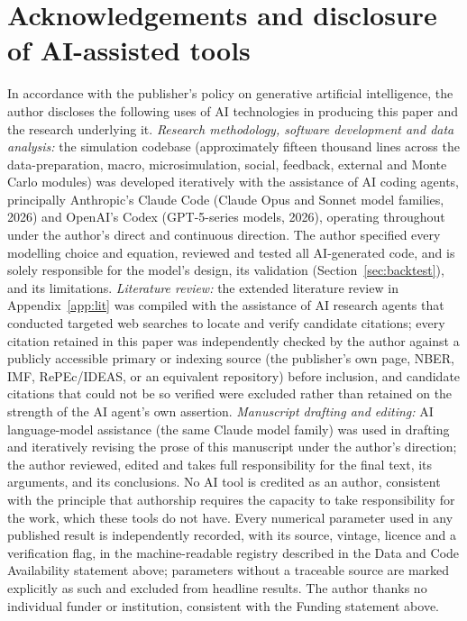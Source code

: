 \documentclass[11pt,a4paper]{article}
\begin{document}
\section*{Acknowledgements and disclosure of AI-assisted tools}
In accordance with the publisher's policy on generative artificial intelligence, the author discloses the following uses of AI technologies in producing this paper and the research underlying it. \emph{Research methodology, software development and data analysis:} the simulation codebase (approximately fifteen thousand lines across the data-preparation, macro, microsimulation, social, feedback, external and Monte Carlo modules) was developed iteratively with the assistance of AI coding agents, principally Anthropic's Claude Code (Claude Opus and Sonnet model families, 2026) and OpenAI's Codex (GPT-5-series models, 2026), operating throughout under the author's direct and continuous direction. The author specified every modelling choice and equation, reviewed and tested all AI-generated code, and is solely responsible for the model's design, its validation (Section~\ref{sec:backtest}), and its limitations. \emph{Literature review:} the extended literature review in Appendix~\ref{app:lit} was compiled with the assistance of AI research agents that conducted targeted web searches to locate and verify candidate citations; every citation retained in this paper was independently checked by the author against a publicly accessible primary or indexing source (the publisher's own page, NBER, IMF, RePEc/IDEAS, or an equivalent repository) before inclusion, and candidate citations that could not be so verified were excluded rather than retained on the strength of the AI agent's own assertion. \emph{Manuscript drafting and editing:} AI language-model assistance (the same Claude model family) was used in drafting and iteratively revising the prose of this manuscript under the author's direction; the author reviewed, edited and takes full responsibility for the final text, its arguments, and its conclusions. No AI tool is credited as an author, consistent with the principle that authorship requires the capacity to take responsibility for the work, which these tools do not have. Every numerical parameter used in any published result is independently recorded, with its source, vintage, licence and a verification flag, in the machine-readable registry described in the Data and Code Availability statement above; parameters without a traceable source are marked explicitly as such and excluded from headline results. The author thanks no individual funder or institution, consistent with the Funding statement above.
\end{document}

